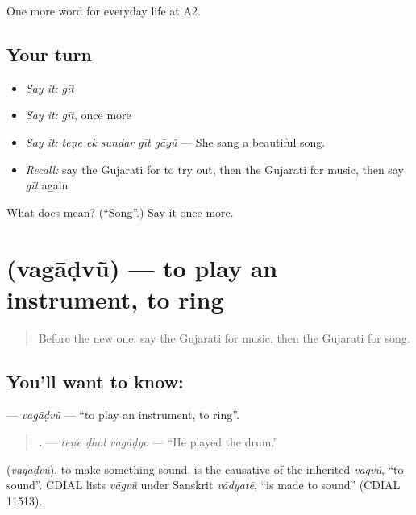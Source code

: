 \begin{grammarlens}[title={What you've built}]
One more word for everyday life at A2.
\end{grammarlens}

\subsection*{Your turn}
\begin{itemize}
\raggedright
  \item \emph{Say it:} \emph{gīt}
  \item \emph{Say it:} \emph{gīt}, once more
  \item \emph{Say it:} \emph{teṇe ek sundar gīt gāyũ} — She sang a beautiful song.
  \item \emph{Recall:} say the Gujarati for to try out, then the Gujarati for music, then say \emph{gīt} again
\end{itemize}

\begin{tcolorbox}[breakable,colback=teal!4,colframe=teal!35!black,title={Before you move on}]
What does  mean? (\textquotedblleft{}Song\textquotedblright{}.) Say it once more.
\end{tcolorbox}
\section[\texorpdfstring{\gu{વગાડવું} (vagāḍvũ)}{વગાડવું (vagāḍvũ)}]{ (vagāḍvũ) — to play an instrument, to ring}

\label{lesson:GU-C254-vagadvu}



\begin{quote}
Before the new one: say the Gujarati for music, then the Gujarati for song.
\end{quote}

\subsection*{You'll want to know: }
\textbf{} — \emph{vagāḍvũ} — \textquotedblleft{}to play an instrument, to ring\textquotedblright{}.

\begin{quote}
\textbf{  .} — \emph{teṇe ḍhol vagāḍyo} — \textquotedblleft{}He played the drum.\textquotedblright{}
\end{quote}

\begin{cousinweb}
\textbf{} (\emph{vagāḍvũ}), to make something sound, is the causative of the inherited \emph{vāgvũ}, \textquotedblleft{}to sound\textquotedblright{}. CDIAL lists \emph{vāgvũ} under Sanskrit \emph{vādyatē}, \textquotedblleft{}is made to sound\textquotedblright{} (CDIAL 11513).
\end{cousinweb}

